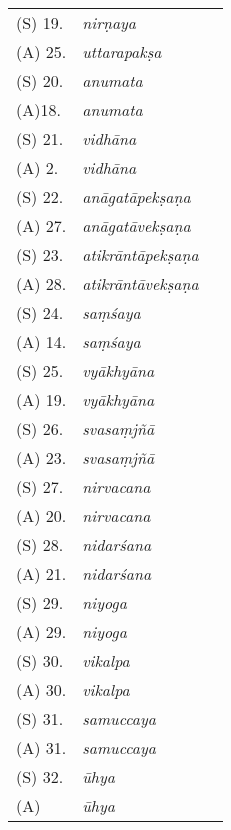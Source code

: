 \begin{longtable}{m{} m{} p{}}
	\rule{0pt}{0.5cm}(S) 19. & \textit{nirṇaya} & \dev{/} \\
	(A) 25. & \textit{uttarapakṣa} & \dev{/} \\
	
	\rule{0pt}{0.5cm}(S) 20. & \textit{anumata} & \dev{/} \\
	(A)18. & \textit{anumata} & \dev{/} \\
	
	\rule{0pt}{0.5cm}(S) 21. & \textit{vidhāna} & \dev{/} \\
	(A) 2. & \textit{vidhāna} & \dev{/} \\
	
	\rule{0pt}{0.5cm}(S) 22. & \textit{anāgatāpekṣaṇa} & \dev{/} \\
	(A) 27. & \textit{anāgatāvekṣaṇa} & \dev{/} \\
	
	\rule{0pt}{0.5cm}(S) 23. & \textit{atikrāntāpekṣaṇa} & \dev{/} \\
	(A) 28. & \textit{atikrāntāvekṣaṇa} & \dev{/} \\
	
	\rule{0pt}{0.5cm}(S) 24. & \textit{saṃśaya} & \dev{/} \\
	(A) 14. & \textit{saṃśaya} & \dev{/} \\
	
	\rule{0pt}{0.5cm}(S) 25. & \textit{vyākhyāna} & \dev{/} \\
	(A) 19. & \textit{vyākhyāna} & \dev{/} \\
	
	\rule{0pt}{0.5cm}(S) 26. & \textit{svasaṃjñā} & \dev{/} \\
	(A) 23. & \textit{svasaṃjñā} & \dev{/} \\
	
	\rule{0pt}{0.5cm}(S) 27. & \textit{nirvacana} & \dev{/} \\
	(A) 20. & \textit{nirvacana} & \dev{/} \\
	
	\rule{0pt}{0.5cm}(S) 28. & \textit{nidarśana} & \dev{/} \\
	(A) 21. & \textit{nidarśana} & \dev{/} \\
	
	\rule{0pt}{0.5cm}(S) 29. & \textit{niyoga} & \dev{/} \\
	(A) 29. & \textit{niyoga} & \dev{/} \\
	
	\rule{0pt}{0.5cm}(S) 30. & \textit{vikalpa} & \dev{/} \\
	(A) 30. & \textit{vikalpa} & \dev{/} \\
	
	\rule{0pt}{0.5cm}(S) 31. & \textit{samuccaya} & \dev{/} \\
	(A) 31. & \textit{samuccaya} & \dev{/} \\
	
	\rule{0pt}{0.5cm}(S) 32. & \textit{ūhya} & \dev{/} \\
	(A) & \textit{ūhya} & \dev{/} \\
			
	\bottomrule



\end{longtable}

